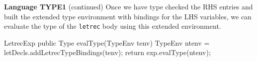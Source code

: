 \begin{minipage}[t]{\sw}
\slidenumber
\LARGE
{\bf Language TYPE1} (continued)\exx
Once we have type checked the RHS entries
and built the extended type environment with bindings
for the LHS variables,
we can evaluate the type of the \verb'letrec' body
using this extended environment.
{\Large
\begin{qv}
LetrecExp
    public Type evalType(TypeEnv tenv) {
        TypeEnv ntenv = letDecls.addLetrecTypeBindings(tenv);
        return exp.evalType(ntenv);
    }
\end{qv}
}
\end{minipage}
